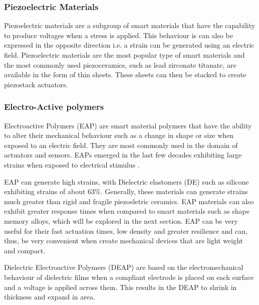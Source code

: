 \subsubsection{Piezoelectric Materials}
Piezoelectric materials are a subgroup of smart materials that have the capability to produce voltages when a stress is applied. This behaviour is can also be expressed in the opposite direction i.e. a strain can be generated using an electric field. Piezoelectric materials are the most popular type of smart materials and the most commonly used piezoceramics, such as lead zirconate titanate, are available in the form of thin sheets. These sheets can then be stacked to create piezostack actuators.

\subsubsection{Electro-Active polymers}
Electroactive Polymers (EAP) are smart material polymers that have the ability to alter their mechanical behaviour such as a change in shape or size when exposed to an electric field. They are most commonly used in the domain of actuators and sensors. EAPs emerged in the last few decades exhibiting large strains when exposed to electrical stimulus \cite{bar-cohen_artificial_2005}.

EAP can generate high strains, with Dielectric elastomers (DE) such as silicone exhibiting strains of about 63\%\cite{kornbluh_electroactive_2004}. Generally, these materials can generate strains much greater than rigid and fragile piezoeletric ceramics. EAP materials can also exhibit greater response times when compared to smart materials such as shape memory alloys, which will be explored in the next section. EAP can be very useful for their fast actuation times, low density and greater resilience and can, thus, be very convenient when create mechanical devices that are light weight and compact.

Dielectric Electroactive Polymers (DEAP) are based on the electromechanical behaviour of dielectric films when a compliant electrode is placed on each surface and a voltage is applied across them. This results in the DEAP to shrink in thickness and expand in area.


